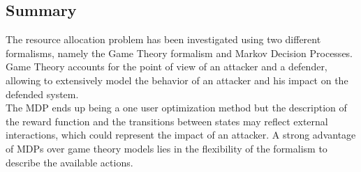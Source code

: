 
\subsection{Summary}
The resource allocation problem has been investigated using two different formalisms, namely the Game Theory formalism and Markov Decision Processes.
Game Theory accounts for the point of view of an attacker and a defender, allowing to extensively model the behavior of an attacker and his impact on the defended system.\\
The MDP ends up being a one user optimization method but the description of the reward function and the transitions between states may reflect external interactions, which could represent the impact of an attacker.
A strong advantage of MDPs over game theory models lies in the flexibility of the formalism to describe the available actions.

